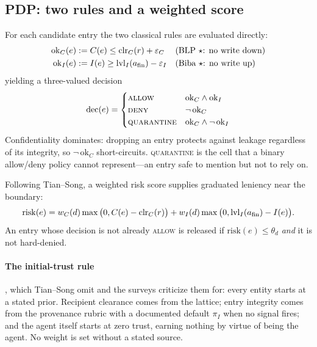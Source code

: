 \subsection{PDP: two rules and a weighted score}
\label{sec:method:pdp}

For each candidate entry the two classical rules are evaluated directly:
\begin{align}
\mathrm{ok}_C(e) &:= C(e) \le \mathrm{clr}_C(r) + \varepsilon_C
  &&\text{(BLP $\star$: no write down)}\\
\mathrm{ok}_I(e) &:= I(e) \ge \mathrm{lvl}_I(a_{\mathrm{fin}}) - \varepsilon_I
  &&\text{(Biba $\star$: no write up)}
\end{align}
yielding a three-valued decision
\begin{equation}
\mathrm{dec}(e) =
\begin{cases}
\textsc{allow} & \mathrm{ok}_C \wedge \mathrm{ok}_I\\
\textsc{deny} & \neg\,\mathrm{ok}_C\\
\textsc{quarantine} & \mathrm{ok}_C \wedge \neg\,\mathrm{ok}_I
\end{cases}
\end{equation}
Confidentiality dominates: dropping an entry protects against leakage
regardless of its integrity, so $\neg\,\mathrm{ok}_C$ short-circuits.
\textsc{quarantine} is the cell that a binary allow/deny policy cannot
represent---an entry safe to mention but not to rely on.

Following Tian--Song, a weighted risk score supplies graduated leniency near
the boundary:
\begin{equation}
\mathrm{risk}(e) = w_C(d)\max\big(0, C(e)-\mathrm{clr}_C(r)\big)
                 + w_I(d)\max\big(0, \mathrm{lvl}_I(a_{\mathrm{fin}})-I(e)\big).
\label{eq:risk}
\end{equation}
An entry whose decision is not already \textsc{allow} is released if
$\mathrm{risk}(e) \le \theta_d$ \emph{and} it is not hard-denied.

\paragraph{The initial-trust rule}, which Tian--Song omit and the surveys
criticize them for: every entity starts at a stated prior. Recipient clearance
comes from the lattice; entry integrity comes from the provenance rubric with a
documented default $\pi_I$ when no signal fires; and the agent itself starts at
zero trust, earning nothing by virtue of being the agent. No weight is set
without a stated source.

